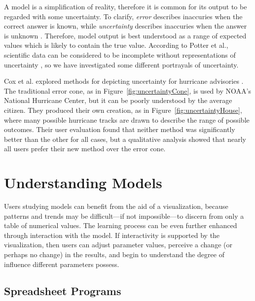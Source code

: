 A model is a simplification of reality, therefore it is common for its output to be regarded with some uncertainty.  To clarify, \textit{error} describes inaccuries when the correct answer is known, while \textit{uncertainty} describes inaccuries when the answer is unknown \cite{hunter1993}.  Therefore, model output is best understood as a range of expected values which is likely to contain the true value.  According to Potter et al., scientific data can be considered to be incomplete without representations of uncertainty \cite{potter2010}, so we have investigated some different portrayals of uncertainty.

Cox et al. explored methods for depicting uncertainty for hurricane advisories \cite{cox2013}.  The traditional error cone, as in Figure~\ref{fig:uncertaintyCone}, is used by NOAA's National Hurricane Center, but it can be poorly understood by the average citizen.  They produced their own creation, as in Figure~\ref{fig:uncertaintyHouse}, where many possible hurricane tracks are drawn to describe the range of possible outcomes.  Their user evaluation found that neither method was significantly better than the other for all cases, but a qualitative analysis showed that nearly all users prefer their new method over the error cone.

\section{Understanding Models}

Users studying models can benefit from the aid of a visualization, because patterns and trends may be difficult---if not impossible---to discern from only a table of numerical values.  The learning process can be even further enhanced through interaction with the model.  If interactivity is supported by the visualization, then users can adjust parameter values, perceive a change (or perhaps no change) in the results, and begin to understand the degree of influence different parameters possess.

\subsection{Spreadsheet Programs}

